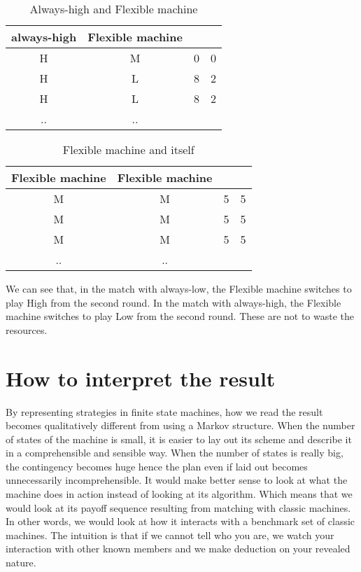 \documentclass[12.5pt]{report}
\begin{document}
\begin{table}[h!]
\center
\begin{tabular}{cc|cc}
always-high & Flexible machine &  & \\
\hline
H & M & 0 & 0 \\
H & L & 8 & 2 \\
H & L & 8 & 2 \\
.. & ..\\
\end{tabular}
\caption{Always-high and Flexible machine}
\end{table}

\begin{table}[h!]
\center
\begin{tabular}{cc|cc}
Flexible machine & Flexible machine &  & \\
\hline
M & M & 5 & 5 \\
M & M & 5 & 5 \\
M & M & 5 & 5 \\
.. & ..\\
\end{tabular}
\caption{Flexible machine and itself}
\end{table}

We can see that, in the match with always-low, the Flexible machine switches to play High from the second round. In the match with always-high, the Flexible machine switches to play Low from the second round. These are not to waste the resources.

\section{How to interpret the result}

By representing strategies in finite state machines, how we read the result becomes qualitatively different from using a Markov structure. When the number of states of the machine is small, it is easier to lay out its scheme and describe it in a comprehensible and sensible way. When the number of states is really big, the contingency becomes huge hence the plan even if laid out becomes unnecessarily incomprehensible. It would make better sense to look at what the machine does in action instead of looking at its algorithm. Which means that we would look at its payoff sequence resulting from matching with classic machines. In other words, we would look at how it interacts with a benchmark set of classic machines. The intuition is that if we cannot tell who you are, we watch your interaction with other known members and we make deduction on your revealed nature.\\
\end{document}
